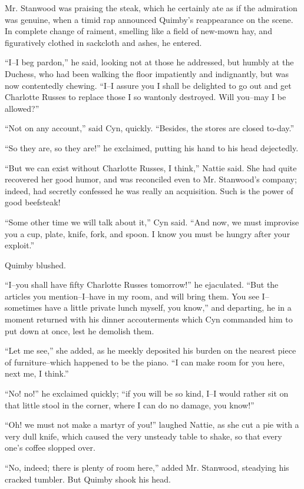 Mr. Stanwood was praising the steak, which he certainly ate as if the
admiration was genuine, when a timid rap announced Quimby's reappearance
on the scene. In complete change of raiment, smelling like a field of
new-mown hay, and figuratively clothed in sackcloth and ashes, he
entered.

``I--I beg pardon,'' he said, looking not at those he addressed, but
humbly at the Duchess, who had been walking the floor impatiently and
indignantly, but was now contentedly chewing. ``I--I assure you I shall
be delighted to go out and get Charlotte Russes to replace those I so
wantonly destroyed. Will you--may I be allowed?''

``Not on any account,'' said Cyn, quickly. ``Besides, the stores are closed
to-day.''

``So they are, so they are!'' he exclaimed, putting his hand to his head
dejectedly.

``But we can exist without Charlotte Russes, I think,'' Nattie said. She
had quite recovered her good humor, and was reconciled even to Mr.
Stanwood's company; indeed, had secretly confessed he was really an
acquisition. Such is the power of good beefsteak!

``Some other time we will talk about it,'' Cyn said. ``And now, we must
improvise you a cup, plate, knife, fork, and spoon. I know you must be
hungry after your exploit.''

Quimby blushed.

``I--you shall have fifty Charlotte Russes tomorrow!'' he ejaculated. ``But
the articles you mention--I--have in my room, and will bring them. You
see I--sometimes have a little private lunch myself, you know,'' and
departing, he in a moment returned with his dinner accouterments which
Cyn commanded him to put down at once, lest he demolish them.

``Let me see,'' she added, as he meekly deposited his burden on the
nearest piece of furniture--which happened to be the piano. ``I can make
room for you here, next me, I think.''

``No! no!'' he exclaimed quickly; ``if you will be so kind, I--I would
rather sit on that little stool in the corner, where I can do no damage,
you know!''

``Oh! we must not make a martyr of you!'' laughed Nattie, as she cut a pie
with a very dull knife, which caused the very unsteady table to shake,
so that every one's coffee slopped over.

``No, indeed; there is plenty of room here,'' added Mr. Stanwood,
steadying his cracked tumbler. But Quimby shook his head.

